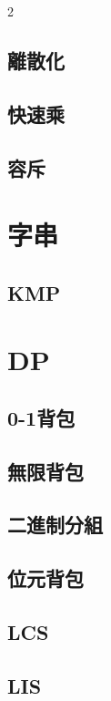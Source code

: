 \documentclass[10pt,a4paper]{article}
\begin{document}
\begin{multicols}{2}
\subsection{離散化}

\subsection{快速乘}

\subsection{容斥}


\section{字串}

\subsection{KMP}


\section{DP}

\subsection{0-1背包}

\subsection{無限背包}

\subsection{二進制分組}

\subsection{位元背包}

\subsection{LCS}

\subsection{LIS}


\end{multicols}
\end{document}

